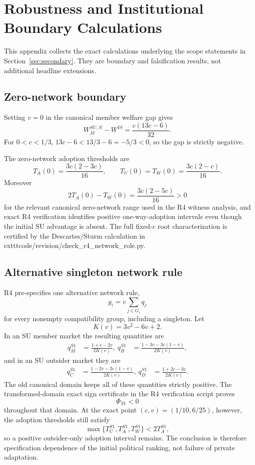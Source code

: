 \section{Robustness and Institutional Boundary Calculations}
\label{app:robustness}

This appendix collects the exact calculations underlying the scope statements in Section~\ref{sec:secondary}. They are boundary and falsification results, not additional headline extensions.

\subsection{Zero-network boundary}

Setting $v=0$ in the canonical member welfare gap gives
\begin{equation}
W_M^{SU,N}-W^{IS}
=
\frac{c(13c-6)}{32}.
\label{eq:appendix-zero-network-gap}
\end{equation}
For $0<c<1/3$, $13c-6<13/3-6=-5/3<0$, so the gap is strictly negative.

The zero-network adoption thresholds are
\begin{equation}
T_A(0)=\frac{3c(2-3c)}{16},
\qquad
T_U(0)=T_W(0)=\frac{3c(2-c)}{16}.
\label{eq:appendix-zero-network-thresholds}
\end{equation}
Moreover
\[
2T_A(0)-T_W(0)
=
\frac{3c(2-5c)}{16}>0
\]
for the relevant canonical zero-network range used in the R4 witness analysis, and exact R4 verification identifies positive one-way-adoption intervals even though the initial SU advantage is absent. The full fixed-$c$ root characterization is certified by the Descartes/Sturm calculation in 	exttt{code/revision/check\_r4\_network\_role.py}.

\subsection{Alternative singleton network rule}

R4 pre-specifies one alternative network rule,
\[
g_i=v\sum_{j\in G_i}q_j
\]
for every nonempty compatibility group, including a singleton. Let
\[
K(v)=3v^2-6v+2.
\]
In an SU member market the resulting quantities are
\begin{align}
q_M^{S1}
&=
\frac{1+c-2v}{2K(v)},\
q_B^{S1}
&=
\frac{1-3v-3c(1-v)}{2K(v)},
\end{align}
and in an SU outsider market they are
\begin{align}
q_C^{S1}
&=
\frac{1-2v-2c(1-v)}{2K(v)},\
q_D^{S1}
&=
\frac{1+2c-3v}{2K(v)}.
\end{align}
The old canonical domain keeps all of these quantities strictly positive. The transformed-domain exact sign certificate in the R4 verification script proves
\[
\Phi_{S1}<0
\]
throughout that domain. At the exact point $(c,v)=(1/10,6/25)$, however, the adoption thresholds still satisfy
\[
\max\{T_U^{S1},T_A^{S1},T_W^{S1}\}<2T_A^{S1},
\]
so a positive outsider-only adoption interval remains. The conclusion is therefore specification dependence of the initial political ranking, not failure of private adaptation.


